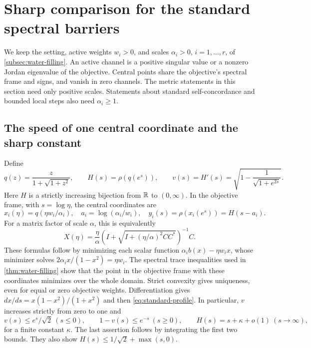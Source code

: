 \section{Sharp comparison for the standard spectral barriers}
\label{sec:sharp-centrality}
We keep the setting, active weights $w_i>0$, and scales
$\alpha_i>0$, $i=1,\ldots,r$, of \cref{subsec:water-filling}. An
active channel is a positive singular value or a nonzero Jordan
eigenvalue of the objective. Central points share the objective's
spectral frame and signs, and vanish in zero channels. The metric statements in this section
need only positive scales. Statements about standard self-concordance
and bounded local steps also need $\alpha_i\geq1$.

\subsection{The speed of one central coordinate and the sharp constant}
Define
\begin{equation}
 q(z)=\frac{z}{1+\sqrt{1+z^2}},\qquad
 H(s)=\rho(q(e^s)),\qquad
 v(s)=H'(s)=\sqrt{1-\frac1{\sqrt{1+e^{2s}}}}.
 \label{eq:standard-profile}
\end{equation}
Here $H$ is a strictly increasing bijection from $\mathbb R$ to $(0,\infty)$.
In the objective frame, with $s=\log\eta$, the central coordinates are
\begin{equation}
 x_i(\eta)=q(\eta w_i/\alpha_i),\quad
 a_i=\log(\alpha_i/w_i),\quad
 y_i(s)=\rho(x_i(e^s))=H(s-a_i).
 \label{eq:central-coordinates}
\end{equation}
For a matrix factor of scale $\alpha$, this is equivalently
\[
 X(\eta)=\frac\eta\alpha
 \left(I+\sqrt{I+(\eta/\alpha)^2CC^*}\right)^{-1}C.
\]
These formulas follow by minimizing each scalar function
$\alpha_i b(x)-\eta w_ix$, whose minimizer solves
$2\alpha_i x/(1-x^2)=\eta w_i$. The spectral trace inequalities used in
\cref{thm:water-filling} show that the point in the objective frame with
these coordinates minimizes over the whole domain. Strict convexity
gives uniqueness, even for equal or zero objective weights.
Differentiation gives
$dx/ds=x(1-x^2)/(1+x^2)$ and then \eqref{eq:standard-profile}.
In particular, $v$ increases strictly from zero to one and
\begin{equation}
 v(s)\leq e^s/\sqrt2\ (s\leq0),\qquad
 1-v(s)\leq e^{-s}\ (s\geq0),\qquad
 H(s)=s+\kappa+o(1)\ (s\to\infty),
 \label{eq:profile-tails}
\end{equation}
for a finite constant $\kappa$. The last assertion follows by integrating
the first two bounds. They also show $H(s)\leq1/\sqrt2+\max(s,0)$.

